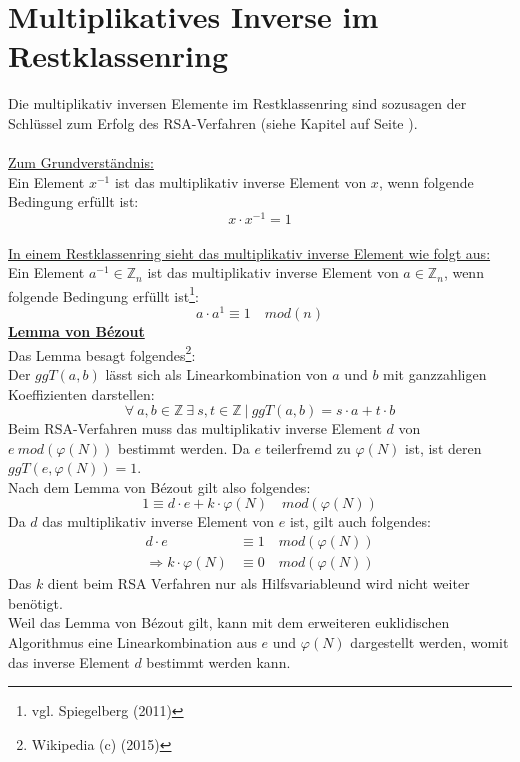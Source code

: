 \section{Multiplikatives Inverse im Restklassenring}
\label{sec:Inverse_Restklassenring}
Die multiplikativ inversen Elemente im Restklassenring sind sozusagen der Schlüssel zum Erfolg des RSA-Verfahren (siehe Kapitel \textit{} auf Seite \pageref{sec:Beweis}).\\
\\
\underline{Zum Grundverständnis:}\\
Ein Element $x^{-1}$ ist das multiplikativ inverse Element von $x$, wenn folgende Bedingung erfüllt ist:
\begin{equation*}
 x \cdot x^{-1}=1
\end{equation*}\\
\underline{In einem Restklassenring sieht das multiplikativ inverse Element wie folgt aus:}\\
Ein Element $a^{-1} \in \mathbb{Z}_n$ ist das multiplikativ inverse Element von $a \in \mathbb{Z}_n$, wenn folgende Bedingung erfüllt ist\footnote{vgl. Spiegelberg (2011)}:
\begin{equation*}
a \cdot a^{1} \equiv 1 \quad mod(n)
\end{equation*}
\underline{\textbf{Lemma von Bézout}}\\
Das Lemma besagt folgendes\footnote{Wikipedia (c) (2015)}:\\
Der $ggT(a,b)$ lässt sich als Linearkombination von $a$ und $b$ mit ganzzahligen Koeffizienten darstellen:
\begin{equation*}
\forall~a,b \in \mathbb{Z}~\exists~s,t \in \mathbb{Z}~|~ggT(a,b)=s\cdot a+t\cdot b
\end{equation*}
Beim RSA-Verfahren muss das multiplikativ inverse Element $d$ von $e~mod(\varphi(N))$ bestimmt werden. Da $e$ teilerfremd zu $\varphi(N)$ ist, ist deren $ggT(e,\varphi(N))=1$.\\
Nach dem Lemma von Bézout gilt also folgendes:
\begin{equation*}
1\equiv d \cdot e + k \cdot \varphi(N) \quad mod(\varphi(N))
\end{equation*}
Da $d$ das multiplikativ inverse Element von $e$ ist, gilt auch folgendes:
\begin{align*}
d\cdot e &\equiv 1 \quad mod(\varphi(N))\\
\Rightarrow k \cdot \varphi(N) &\equiv 0 \quad mod(\varphi(N))
\end{align*}
Das $k$ dient beim RSA Verfahren nur als \glqq Hilfsvariable\grqq und wird nicht weiter benötigt.\\
Weil das Lemma von Bézout gilt, kann mit dem erweiteren euklidischen Algorithmus eine Linearkombination aus $e$ und $\varphi(N)$ dargestellt werden, womit das inverse Element $d$ bestimmt werden kann.
